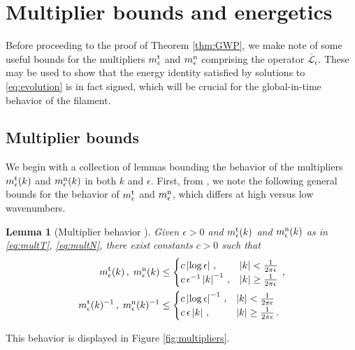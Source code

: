 \documentclass[11pt,reqno]{amsart}
\newcommand{\abs}[1]{\left\lvert #1 \right\rvert}
\newcommand{\mc}[1]{\mathcal{#1}}
\numberwithin{equation}{section}
\newtheorem{lemma}[theorem]{Lemma}
\theoremstyle{definition}
\begin{document}
\section{Multiplier bounds and energetics}
Before proceeding to the proof of Theorem \ref{thm:GWP}, we make note of some useful bounds for the multipliers $m_\epsilon^{\rm t}$ and $m_\epsilon^{\rm n}$ comprising the operator $\overline{\mc{L}}_\epsilon$. These may be used to show that the energy identity satisfied by solutions to \eqref{eq:evolution} is in fact signed, which will be crucial for the global-in-time behavior of the filament. 


\subsection{Multiplier bounds}
We begin with a collection of lemmas bounding the behavior of the multipliers $m_\epsilon^{\rm t}(k)$ and $m_\epsilon^{\rm n}(k)$ in both $k$ and $\epsilon$. 
First, from \cite[Lemmas 3.4 \& 3.5]{ohm2024free}, we note the following general bounds for the behavior of $m_\epsilon^{\rm t}$ and $m_\epsilon^{\rm n}$, which differs at high versus low wavenumbers. 
%
\begin{lemma}[Multiplier behavior \cite{ohm2024free}]\label{lem:multiplierbds}
Given $\epsilon>0$ and $m_\epsilon^{\rm t}(k)$ and $m_\epsilon^{\rm n}(k)$ as in \eqref{eq:multT}, \eqref{eq:multN}, there exist constants $c>0$ such that 
  \begin{equation}
  \begin{aligned}
    m_\epsilon^{\rm t}(k)\,,\;m_\epsilon^{\rm n}(k) &\le \begin{cases}
      c\abs{\log\epsilon} \,, & \abs{k}< \frac{1}{2\pi\epsilon}\\
      c\,\epsilon^{-1}\abs{k}^{-1} \,, & \abs{k}\ge \frac{1}{2\pi\epsilon}
    \end{cases} \,,\\
    m_\epsilon^{\rm t}(k)^{-1}\,,\; m_\epsilon^{\rm n}(k)^{-1} &\le \begin{cases}
      c\abs{\log\epsilon}^{-1} \,, & \abs{k}< \frac{1}{2\pi\epsilon}\\
      c\,\epsilon\abs{k} \,, & \abs{k}\ge \frac{1}{2\pi\epsilon}\,.
    \end{cases}
  \end{aligned}
  \end{equation}
\end{lemma}
This behavior is displayed in Figure \ref{fig:multipliers}.
\end{document}
